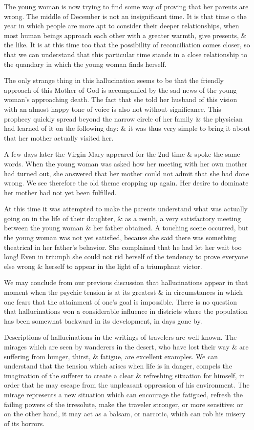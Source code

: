 \documentclass{article}
\begin{document}
The young woman is now trying to find some way of proving that her parents are wrong. The middle of December is not an insignificant time. It is that time o the year in which people are more apt to consider their deeper relationships, when most human beings approach each other with a greater warmth, give presents, \& the like. It is at this time too that the possibility of reconciliation comes closer, so that we can understand that this particular time stands in a close relationship to the quandary in which the young woman finds herself.

The only strange thing in this hallucination seems to be that the friendly approach of this Mother of God is accompanied by the sad news of the young woman's approaching death. The fact that she told her husband of this vision with an almost happy tone of voice is also not without significance. This prophecy quickly spread beyond the narrow circle of her family \& the physician had learned of it on the following day: \& it was thus very simple to bring it about that her mother actually visited her.

A few days later the Virgin Mary appeared for the 2nd time \& spoke the same words. When the young woman was asked how her meeting with her own mother had turned out, she answered that her mother could not admit that she had done wrong. We see therefore the old theme cropping up again. Her desire to dominate her mother had not yet been fulfilled.

At this time it was attempted to make the parents understand what was actually going on in the life of their daughter, \& as a result, a very satisfactory meeting between the young woman \& her father obtained. A touching scene occurred, but the young woman was not yet satisfied, because she said there was something theatrical in her father's behavior. She complained that he had let her wait too long! Even in triumph she could not rid herself of the tendency to prove everyone else wrong \& herself to appear in the light of a triumphant victor.

We may conclude from our previous discussion that hallucinations appear in that moment when the psychic tension is at its greatest \& in circumstances in which one fears that the attainment of one's goal is impossible. There is no question that hallucinations won a considerable influence in districts where the population has been somewhat backward in its development, in days gone by.

Descriptions of hallucinations in the writings of travelers are well known. The mirages which are seen by wanderers in the desert, who have lost their way \& are suffering from hunger, thirst, \& fatigue, are excellent examples. We can understand that the tension which arises when life is in danger, compels the imagination of the sufferer to create a clear \& refreshing situation for himself, in order that he may escape from the unpleasant oppression of his environment. The mirage represents a new situation which can encourage the fatigued, refresh the failing powers of the irresolute, make the traveler stronger, or more sensitive: or on the other hand, it may act as a balsam, or narcotic, which can rob his misery of its horrors.
\end{document}
